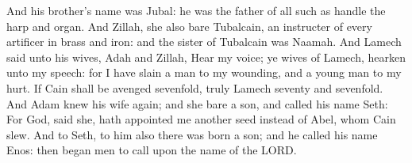 \begin{biblechapter}
\verse And his brother's name was Jubal: he was the father of all such as handle the harp and organ.
\verse And Zillah, she also bare Tubalcain, an instructer of every artificer in brass and iron: and the sister of Tubalcain was Naamah.
\verse And Lamech said unto his wives, Adah and Zillah, Hear my voice; ye wives of Lamech, hearken unto my speech: for I have slain a man to my wounding, and a young man to my hurt.
\verse If Cain shall be avenged sevenfold, truly Lamech seventy and sevenfold.
\verse And Adam knew his wife again; and she bare a son, and called his name Seth: For God, said she, hath appointed me another seed instead of Abel, whom Cain slew.
\verse And to Seth, to him also there was born a son; and he called his name Enos: then began men to call upon the name of the LORD.
\end{biblechapter}

